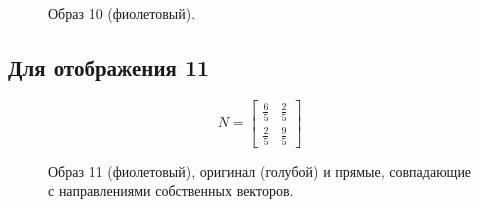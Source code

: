 \documentclass[a5paper, 10pt]{article}
\theoremstyle{definition}
\theoremstyle{plain}
\theoremstyle{remark}
\begin{document}
\begin{figure}[h]
\caption{Образ 10 (фиолетовый).}
\end{figure}

\newpage
\subsection{Для отображения 11}
\begin{equation}
N =
\begin{bmatrix}
\frac{6}{5} & \frac{2}{5}\\
\frac{2}{5} & \frac{9}{5}
\end{bmatrix}
\end{equation}

\begin{figure}[h]
\caption{Образ 11 (фиолетовый), оригинал (голубой) и прямые, совпадающие с направлениями собственных векторов.}
\end{figure}
\end{document}
